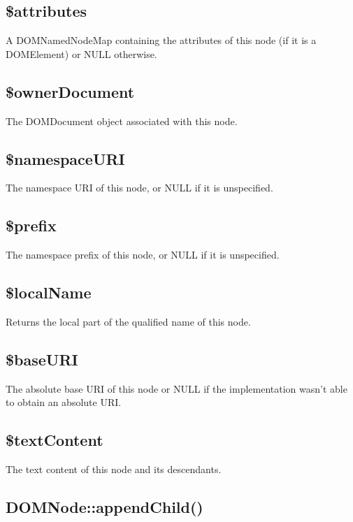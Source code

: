 \subsection{\$attributes}

A DOMNamedNodeMap containing the attributes of this node (if it is a DOMElement) or NULL otherwise.

\subsection{\$ownerDocument}

The DOMDocument object associated with this node.

\subsection{\$namespaceURI}

The namespace URI of this node, or NULL if it is unspecified.

\subsection{\$prefix}

The namespace prefix of this node, or NULL if it is unspecified.

\subsection{\$localName}

Returns the local part of the qualified name of this node.

\subsection{\$baseURI}

The absolute base URI of this node or NULL if the implementation wasn't able to obtain an absolute URI.

\subsection{\$textContent}

The text content of this node and its descendants.


\subsection{DOMNode::appendChild()}


